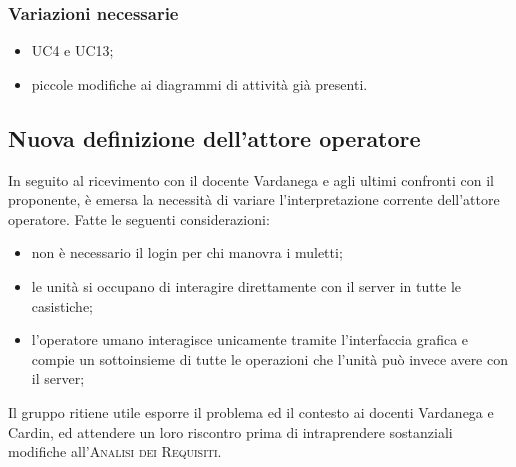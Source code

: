     \subsubsection{Variazioni necessarie}
    \begin{itemize}
        \item UC4 e UC13;
        \item piccole modifiche ai diagrammi di attività già presenti.
    \end{itemize}

\subsection{Nuova definizione dell'attore operatore}
    In seguito al ricevimento con il docente Vardanega e agli ultimi confronti con il proponente, è emersa la necessità di variare l'interpretazione corrente dell'attore operatore. Fatte le seguenti considerazioni:
    \begin{itemize}
        \item non è necessario il login per chi manovra i muletti;
        \item le unità si occupano di interagire direttamente con il server in tutte le casistiche;
        \item l'operatore umano interagisce unicamente tramite l'interfaccia grafica e compie un sottoinsieme di tutte le operazioni che l'unità può invece avere con il server;
    \end{itemize}
Il gruppo ritiene utile esporre il problema ed il contesto ai docenti Vardanega e Cardin, ed attendere un loro riscontro prima di intraprendere sostanziali modifiche all'\textsc{Analisi dei Requisiti}.

